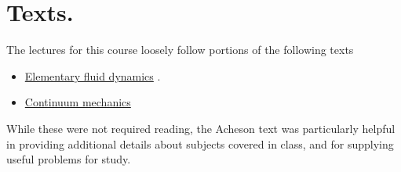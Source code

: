 \section{Texts.}

The lectures for this course loosely follow portions of the following texts

\begin{itemize}
\item \href{http://www.amazon.com/Elementary-Dynamics-Applied-Mathematics-Computing/dp/0198596790/ref=sr_1_1?ie=UTF8&qid=1326302753&sr=8-1}{Elementary fluid dynamics} \cite{acheson1990elementary}.
\item \href{http://www.amazon.com/Theory-Elasticity-Third-Theoretical-Physics/dp/075062633X/ref=sr_1_6?s=books&ie=UTF8&qid=1326302957&sr=1-6}{Continuum mechanics} \cite{landau1960theory}
\end{itemize}

While these were not required reading, the Acheson text was particularly helpful in providing additional details about subjects covered in class, and for supplying useful problems for study.
